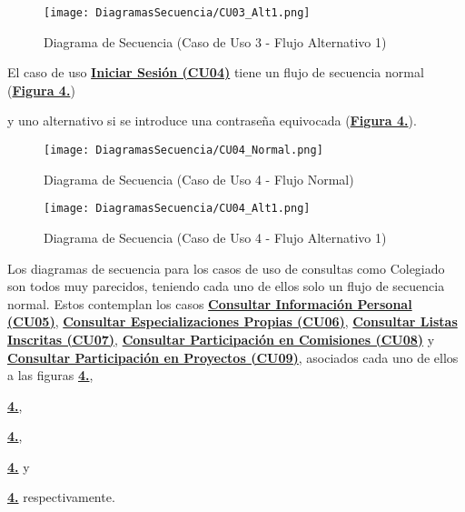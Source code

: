 \begin{landscape}
  \label{fig:Secuencia_CU3_Alt1}
  \vspace*{\fill}
  \begin{figure}[!htbp]
    \centering
    \texttt{[image: DiagramasSecuencia/CU03\_Alt1.png]}
    \caption{Diagrama de Secuencia (Caso de Uso 3 - Flujo Alternativo 1)}
  \end{figure}
  \vfill
\end{landscape}
\FloatBarrier

\addtocounter{figura_cap4}{1}
El caso de uso \textbf{\hyperref[tab:cucIniSes]{Iniciar Sesión (CU04)}} tiene un flujo de secuencia normal (\textbf{\hyperref[fig:Secuencia_CU4_Normal]{Figura 4.}}) \addtocounter{figura_cap4}{1} y uno alternativo si se introduce una contraseña equivocada (\textbf{\hyperref[fig:Secuencia_CU4_Alt1]{Figura 4.}}).
\begin{figure}[!htbp]
  \centering
  \texttt{[image: DiagramasSecuencia/CU04\_Normal.png]}
  \caption{Diagrama de Secuencia (Caso de Uso 4 - Flujo Normal)}
  \label{fig:Secuencia_CU4_Normal}
\end{figure}
\FloatBarrier

\begin{landscape}
  \label{fig:Secuencia_CU4_Alt1}
  \vspace*{\fill}
  \begin{figure}[!htbp]
    \centering
    \texttt{[image: DiagramasSecuencia/CU04\_Alt1.png]}
    \caption{Diagrama de Secuencia (Caso de Uso 4 - Flujo Alternativo 1)}
  \end{figure}
  \vfill
\end{landscape}
\FloatBarrier

\addtocounter{figura_cap4}{1}
Los diagramas de secuencia para los casos de uso de consultas como Colegiado son todos muy parecidos, teniendo cada uno de ellos solo un flujo de secuencia normal. Estos contemplan los casos \textbf{\hyperref[tab:cucConsultaInfoPersonal]{Consultar Información Personal (CU05)}}, \textbf{\hyperref[tab:cucConsultaEspec]{Consultar Especializaciones Propias (CU06)}}, \textbf{\hyperref[tab:cucConsultaLista]{Consultar Listas Inscritas (CU07)}}, \textbf{\hyperref[tab:cucConsultaComision]{Consultar Participación en Comisiones (CU08)}} y \textbf{\hyperref[tab:cucConsultaProyectos]{Consultar Participación en Proyectos (CU09)}}, asociados cada uno de ellos a las figuras \textbf{\hyperref[fig:Secuencia_CU5_Normal]{4.}}, \addtocounter{figura_cap4}{1} \textbf{\hyperref[fig:Secuencia_CU6_Normal]{4.}}, \addtocounter{figura_cap4}{1} \textbf{\hyperref[fig:Secuencia_CU7_Normal]{4.}}, \addtocounter{figura_cap4}{1} \textbf{\hyperref[fig:Secuencia_CU8_Normal]{4.}} y \addtocounter{figura_cap4}{1} \textbf{\hyperref[fig:Secuencia_CU9_Normal]{4.}} respectivamente.


